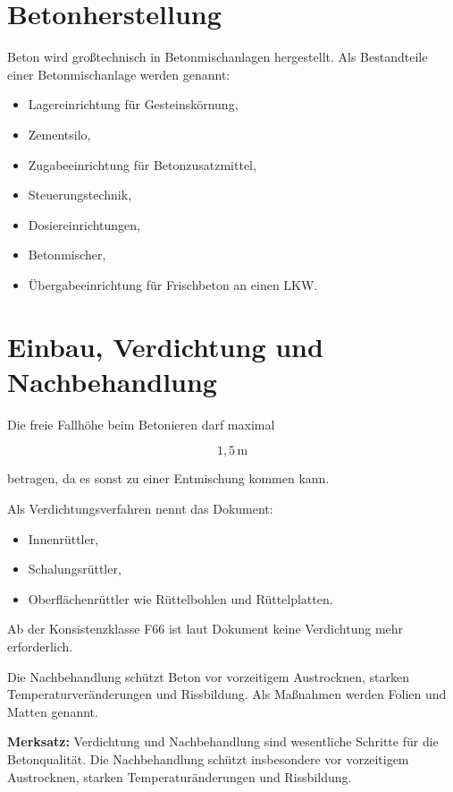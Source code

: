 \documentclass[
  12pt,
  a4paper,
  oneside
]{scrreprt}
\begin{document}
\section{Betonherstellung}

Beton wird großtechnisch in Betonmischanlagen hergestellt. Als
Bestandteile einer Betonmischanlage werden genannt:

\begin{itemize}
  \item Lagereinrichtung für Gesteinskörnung,
  \item Zementsilo,
  \item Zugabeeinrichtung für Betonzusatzmittel,
  \item Steuerungstechnik,
  \item Dosiereinrichtungen,
  \item Betonmischer,
  \item Übergabeeinrichtung für Frischbeton an einen LKW.
\end{itemize}



\section{Einbau, Verdichtung und Nachbehandlung}

Die freie Fallhöhe beim Betonieren darf maximal

\begin{equation}
  1{,}5\,\mathrm{m}
\end{equation}

betragen, da es sonst zu einer Entmischung kommen kann.


Als Verdichtungsverfahren nennt das Dokument:

\begin{itemize}
  \item Innenrüttler,
  \item Schalungsrüttler,
  \item Oberflächenrüttler wie Rüttelbohlen und Rüttelplatten.
\end{itemize}



Ab der Konsistenzklasse F66 ist laut Dokument keine Verdichtung mehr
erforderlich.


Die Nachbehandlung schützt Beton vor vorzeitigem Austrocknen, starken
Temperaturveränderungen und Rissbildung. Als Maßnahmen werden Folien
und Matten genannt.


\begin{merksatzbox}
\textbf{Merksatz:}
Verdichtung und Nachbehandlung sind wesentliche Schritte für die
Betonqualität. Die Nachbehandlung schützt insbesondere vor vorzeitigem
Austrocknen, starken Temperaturänderungen und Rissbildung.

\end{merksatzbox}
\end{document}
